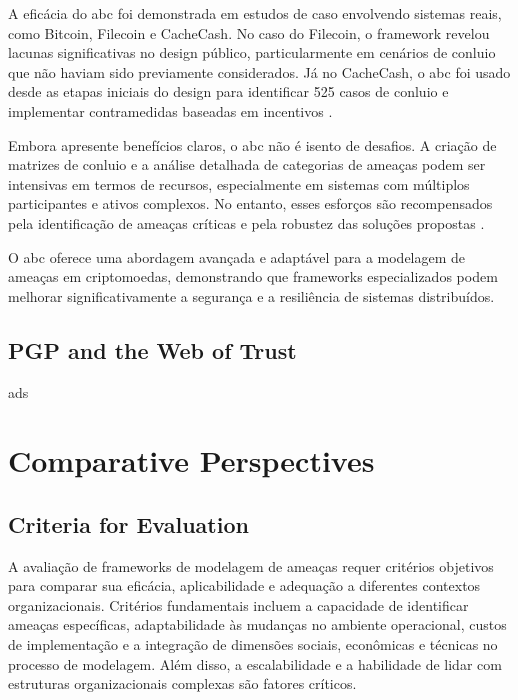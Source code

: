 A eficácia do \gls{abc} foi demonstrada em estudos de caso envolvendo
sistemas reais, como Bitcoin, Filecoin e CacheCash. No caso do
Filecoin, o framework revelou lacunas significativas no design
público, particularmente em cenários de conluio que não haviam sido
previamente considerados. Já no CacheCash, o \gls{abc} foi usado desde as
etapas iniciais do design para identificar 525 casos de conluio e
implementar contramedidas baseadas em incentivos \cite{AbcCrypto}.

Embora apresente benefícios claros, o \gls{abc} não é isento de desafios. A
criação de matrizes de conluio e a análise detalhada de categorias de
ameaças podem ser intensivas em termos de recursos, especialmente em
sistemas com múltiplos participantes e ativos complexos. No entanto,
esses esforços são recompensados pela identificação de ameaças
críticas e pela robustez das soluções propostas \cite{AbcCrypto}.

O \gls{abc} oferece uma abordagem avançada e adaptável para a modelagem de
ameaças em criptomoedas, demonstrando que frameworks especializados
podem melhorar significativamente a segurança e a resiliência de
sistemas distribuídos.


\subsection{PGP and the Web of Trust}
\label{subsec:pgp_web_of_trust}
ads

\section{Comparative Perspectives}
\label{sec:comparative_perspectives}

\subsection{Criteria for Evaluation}
\label{subsec:criteria_evaluation}

A avaliação de frameworks de modelagem de ameaças requer critérios
objetivos para comparar sua eficácia, aplicabilidade e adequação a
diferentes contextos organizacionais. Critérios fundamentais incluem a
capacidade de identificar ameaças específicas, adaptabilidade às
mudanças no ambiente operacional, custos de implementação e a
integração de dimensões sociais, econômicas e técnicas no processo de
modelagem. Além disso, a escalabilidade e a habilidade de lidar com
estruturas organizacionais complexas são fatores críticos.

